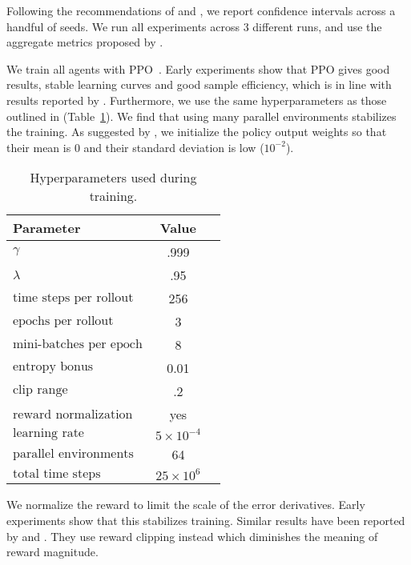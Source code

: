 Following the recommendations of \cite{henderson_matters_2018} and \cite{agarwal_rlliable_2022}, we report confidence intervals across a handful of seeds.
We run all experiments across 3 different runs, and use the aggregate metrics proposed by \cite{agarwal_rlliable_2022}.

We train all agents with PPO~\cite{schulman_ppo_2017}.
Early experiments show that PPO gives good results, stable learning curves and good sample efficiency, which is in line with results reported by \cite{andrychowicz_empirical_2020}.
Furthermore, we use the same hyperparameters as those outlined in \cite{cobbe_procgen_2020} (Table~\ref{tab:hyperparameters}).
We find that using many parallel environments stabilizes the training.
As suggested by \cite{andrychowicz_empirical_2020}, we initialize the policy output weights so that their mean is 0 and their standard deviation is low (\(10^{-2}\)).

\begin{table}
    \centering
    \caption{Hyperparameters used during training.}
    \begin{tabular}{lcc}
        \toprule
        \textbf{Parameter} & \textbf{Value} \\
        \midrule
        \(\gamma\) & .999 \\
        \(\lambda\) & .95 \\
        \(\text{time steps per rollout}\) & 256 \\
        \(\text{epochs per rollout}\) & 3 \\
        \(\text{mini-batches per epoch}\) & 8 \\
        \(\text{entropy bonus}\) & 0.01 \\
        \(\text{clip range}\) & .2 \\
        \(\text{reward normalization}\) & yes \\
        \(\text{learning rate}\) & \(5 \times 10^{-4}\) \\
        \(\text{parallel environments}\) & 64 \\
        \(\text{total time steps}\) & \(25 \times 10^6\) \\
        \bottomrule
    \end{tabular}
    \label{tab:hyperparameters}
\end{table}

We normalize the reward to limit the scale of the error derivatives.
Early experiments show that this stabilizes training.
Similar results have been reported by \cite{andrychowicz_empirical_2020} and \cite{mnih_atari_2013}.
They use reward clipping instead which diminishes the meaning of reward magnitude.

